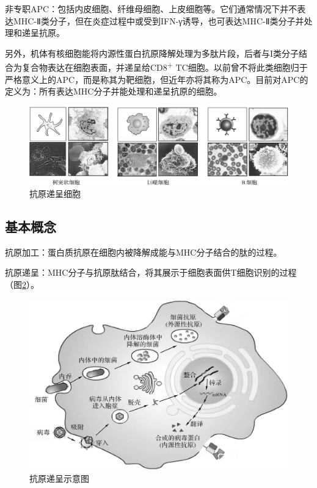 非专职APC：包括内皮细胞、纤维母细胞、上皮细胞等。它们通常情况下并不表达MHC-Ⅱ类分子，但在炎症过程中或受到IFN-γ诱导，也可表达MHC-Ⅱ类分子并处理和递呈抗原。

另外，机体有核细胞能将内源性蛋白抗原降解处理为多肽片段，后者与I类分子结合为复合物表达在细胞表面，并递呈给CD8\textsuperscript{+}
TC细胞。以前曾不将此类细胞归于严格意义上的APC，而是称其为靶细胞，但近年亦将其称为APC。目前对APC的定义为：所有表达MHC分子并能处理和递呈抗原的细胞。

\begin{figure}[!htbp]
 \centering
 \includegraphics[width=.7\textwidth]{./images/Image00127.jpg}
 \captionsetup{justification=centering}
 \caption{抗原递呈细胞}
 \label{fig9-1}
  \end{figure} 


\subsection{基本概念}

抗原加工：蛋白质抗原在细胞内被降解成能与MHC分子结合的肽的过程。

抗原递呈：MHC分子与抗原肽结合，将其展示于细胞表面供T细胞识别的过程（图\ref{fig9-2}）。

\begin{figure}[!htbp]
 \centering
 \includegraphics{./images/Image00128.jpg}
 \captionsetup{justification=centering}
 \caption{抗原递呈示意图}
 \label{fig9-2}
  \end{figure} 


